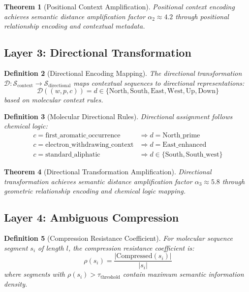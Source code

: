 \documentclass[12pt,a4paper]{article}
\newtheorem{theorem}{Theorem}[section]
\newtheorem{definition}[theorem]{Definition}
\begin{document}
\begin{theorem}[Positional Context Amplification]
Positional context encoding achieves semantic distance amplification factor $\alpha_2 \approx 4.2$ through positional relationship encoding and contextual metadata.
\end{theorem}

\subsection{Layer 3: Directional Transformation}

\begin{definition}[Directional Encoding Mapping]
The directional transformation $\mathcal{D}: \mathcal{S}_{\text{context}} \rightarrow \mathcal{S}_{\text{directional}}$ maps contextual sequences to directional representations:
\begin{equation}
\mathcal{D}((w, p, c)) = d \in \{\text{North}, \text{South}, \text{East}, \text{West}, \text{Up}, \text{Down}\}
\end{equation}
based on molecular context rules.
\end{definition}

\begin{definition}[Molecular Directional Rules]
Directional assignment follows chemical logic:
\begin{align}
c = \text{first\_aromatic\_occurrence} &\Rightarrow d = \text{North\_prime} \\
c = \text{electron\_withdrawing\_context} &\Rightarrow d = \text{East\_enhanced} \\
c = \text{standard\_aliphatic} &\Rightarrow d \in \{\text{South}, \text{South\_west}\}
\end{align}
\end{definition}

\begin{theorem}[Directional Transformation Amplification]
Directional transformation achieves semantic distance amplification factor $\alpha_3 \approx 5.8$ through geometric relationship encoding and chemical logic mapping.
\end{theorem}

\subsection{Layer 4: Ambiguous Compression}

\begin{definition}[Compression Resistance Coefficient]
For molecular sequence segment $s_i$ of length $l$, the compression resistance coefficient is:
\begin{equation}
\rho(s_i) = \frac{|\text{Compressed}(s_i)|}{|s_i|}
\end{equation}
where segments with $\rho(s_i) > \tau_{\text{threshold}}$ contain maximum semantic information density.
\end{definition}
\end{document}
